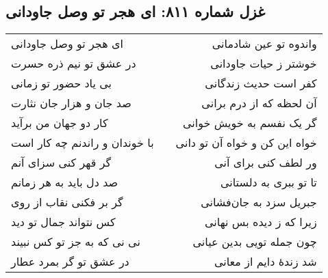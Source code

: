 \begin{center}
\section*{غزل شماره ۸۱۱: ای هجر تو وصل جاودانی}
\label{sec:811}
\begin{longtable}{l p{0.5cm} r}
ای هجر تو وصل جاودانی
&&
واندوه تو عین شادمانی
\\
در عشق تو نیم ذره حسرت
&&
خوشتر ز حیات جاودانی
\\
بی یاد حضور تو زمانی
&&
کفر است حدیث زندگانی
\\
صد جان و هزار جان نثارت
&&
آن لحظه که از درم برانی
\\
کار دو جهان من برآید
&&
گر یک نفسم به خویش خوانی
\\
با خوندان و راندنم چه کار است
&&
خواه این کن و خواه آن تو دانی
\\
گر قهر کنی سزای آنم
&&
ور لطف کنی برای آنی
\\
صد دل باید به هر زمانم
&&
تا تو ببری به دلستانی
\\
گر بر فکنی نقاب از روی
&&
جبریل سزد به جان‌فشانی
\\
کس نتواند جمال تو دید
&&
زیرا که ز دیده بس نهانی
\\
نی نی که به جز تو کس نبیند
&&
چون جمله تویی بدین عیانی
\\
در عشق تو گر بمرد عطار
&&
شد زندهٔ دایم از معانی
\\
\end{longtable}
\end{center}
